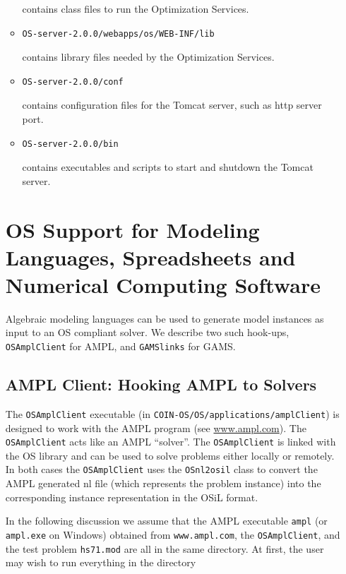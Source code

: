 \documentclass[11pt]{article}
\renewcommand{\_}{{\char"5F}}
\renewcommand{\{}{{\char"7B}}
\renewcommand{\}}{{\char"7D}}
\renewcommand{\^}{{\char"0D}}
\renewcommand{\'}{{\char"0D}}
\begin{document}
\begin{enumerate}[Step 1:]
\begin{itemize}
contains class files to run the Optimization Services.
\item
\begin{verbatim}
OS-server-2.0.0/webapps/os/WEB-INF/lib
\end{verbatim}
contains library files needed by the Optimization Services.
\item
\begin{verbatim}
OS-server-2.0.0/conf
\end{verbatim}
contains configuration files for the Tomcat server, such as http server port.
\item
\begin{verbatim}
OS-server-2.0.0/bin
\end{verbatim}
contains executables and scripts to start and shutdown the Tomcat server.
\end{itemize}



\section{OS Support for Modeling Languages, Spreadsheets and Numerical Computing Software}\label{section:modellang}

Algebraic modeling languages can be used to generate model instances as input to an OS compliant solver.
We describe two such hook-ups, {\tt OSAmplClient} for AMPL, and {\tt GAMSlinks} for GAMS.


\subsection{AMPL Client:  Hooking AMPL to Solvers}\label{section:amplclient}

The {\tt OSAmplClient} executable (in {\tt COIN-OS/OS/applications/amplClient}) is designed to work with the AMPL program
(see \url{www.ampl.com}). The {\tt OSAmplClient} acts like an AMPL ``solver''. The {\tt OSAmplClient} is linked with the
OS library and can be used to solve problems either locally or remotely. In both cases the {\tt OSAmplClient} uses the
{\tt OSnl2osil} class to convert the AMPL generated nl file
(which represents the problem instance) into the corresponding instance representation in the OSiL format.

In the following discussion we assume that the AMPL executable {\tt ampl}  (or {\tt ampl.exe} on Windows) obtained
from {\tt www.ampl.com}, the {\tt OSAmplClient}, and the test problem {\tt hs71.mod} are all in the same directory.
At first, the user may wish to run everything in the directory


\end{enumerate}
\end{document}
